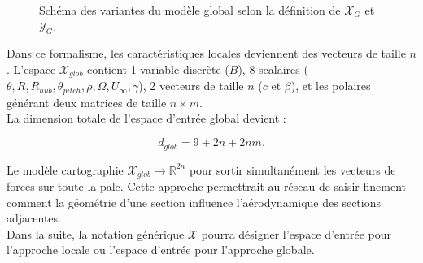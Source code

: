 \documentclass[11pt, a4paper]{article}
\begin{document}
\begin{figure}
\caption{Schéma des variantes du modèle global selon la définition de $\mathcal{X}_G$ et $\mathcal{Y}_G$.}
\label{fig model_global_variantes}
\end{figure}
Dans ce formalisme, les caractéristiques locales deviennent des vecteurs de taille $n$. L'espace $\mathcal{X}_{glob}$ contient 1 variable discrète ($B$), 8 scalaires ($\theta, R, R_{hub}, \theta_{pitch}, \rho, \Omega, U_\infty, \gamma$), 2 vecteurs de taille $n$ ($c$ et $\beta$), et les polaires générant deux matrices de taille $n \times m$. \\

La dimension totale de l'espace d'entrée global devient :

$$ d_{glob} = 9 + 2n + 2nm. $$

Le modèle cartographie $\mathcal{X}_{glob} \to \mathbb{R}^{2n}$ pour sortir simultanément les vecteurs de forces sur toute la pale. Cette approche permettrait au réseau de saisir finement comment la géométrie d'une section influence l'aérodynamique des sections adjacentes. \\

Dans la suite, la notation générique $\mathcal{X}$ pourra désigner l'espace d'entrée pour l'approche locale ou l'espace d'entrée pour l'approche globale.
\end{document}

